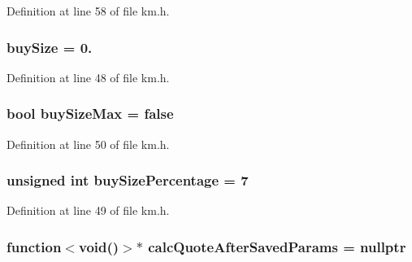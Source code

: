 Definition at line 58 of file km.\+h.

\subsubsection[{\texorpdfstring{buy\+Size}{buySize}}]{ buy\+Size = 0.}\hypertarget{struct_k_1_1m_quoting_params_a78713a07cb23439e664a091f740fef1f}{}\label{struct_k_1_1m_quoting_params_a78713a07cb23439e664a091f740fef1f}


Definition at line 48 of file km.\+h.

\subsubsection[{\texorpdfstring{buy\+Size\+Max}{buySizeMax}}]{\setlength{\rightskip}{0pt plus 5cm}bool buy\+Size\+Max = false}\hypertarget{struct_k_1_1m_quoting_params_a9430749d47750fa7a3571e69aa421524}{}\label{struct_k_1_1m_quoting_params_a9430749d47750fa7a3571e69aa421524}


Definition at line 50 of file km.\+h.

\subsubsection[{\texorpdfstring{buy\+Size\+Percentage}{buySizePercentage}}]{\setlength{\rightskip}{0pt plus 5cm}unsigned int buy\+Size\+Percentage = 7}\hypertarget{struct_k_1_1m_quoting_params_aefdf7026d73172dbed3231b219385e4b}{}\label{struct_k_1_1m_quoting_params_aefdf7026d73172dbed3231b219385e4b}


Definition at line 49 of file km.\+h.

\subsubsection[{\texorpdfstring{calc\+Quote\+After\+Saved\+Params}{calcQuoteAfterSavedParams}}]{\setlength{\rightskip}{0pt plus 5cm}function$<$void()$>$$\ast$ calc\+Quote\+After\+Saved\+Params = nullptr}\hypertarget{struct_k_1_1m_quoting_params_aeada466ca69f4000ae2121f2c75fa7c6}{}\label{struct_k_1_1m_quoting_params_aeada466ca69f4000ae2121f2c75fa7c6}


